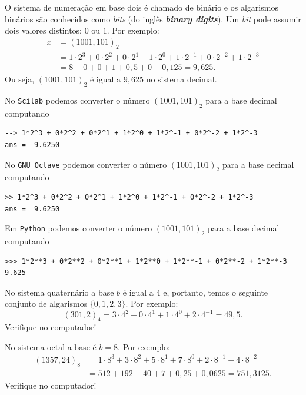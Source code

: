 \begin{ex} O sistema de numeração em base dois é chamado de binário e os algarismos binários são conhecidos como \textit{bits} (do inglês \textit{\bf{b}inary dig\bf{its}}). Um \textit{bit} pode assumir dois valores distintos: $0$ ou $1$. Por exemplo:
\begin{equation}
  \begin{split}
    x &= (1001,101)_{2} \\
    &= 1\cdot 2^3 +0\cdot 2^2 +0\cdot 2^1 +1\cdot 2^0  +1\cdot 2^{-1} +0\cdot 2^{-2} +1\cdot 2^{-3} \\
    &= 8+0+0+1+ 0,5+0+0,125 = 9,625.
  \end{split}
\end{equation}
Ou seja, $(1001,101)_{2}$ é igual a $9,625$ no sistema decimal.

\ifisscilab
No \verb+Scilab+ podemos converter o número $(1001,101)_2$ para a base decimal computando
\begin{verbatim}
--> 1*2^3 + 0*2^2 + 0*2^1 + 1*2^0 + 1*2^-1 + 0*2^-2 + 1*2^-3
ans =  9.6250
\end{verbatim}
\fi
\ifisoctave
No \verb+GNU Octave+ podemos converter o número $(1001,101)_2$ para a base decimal computando
\begin{verbatim}
>> 1*2^3 + 0*2^2 + 0*2^1 + 1*2^0 + 1*2^-1 + 0*2^-2 + 1*2^-3
ans =  9.6250
\end{verbatim}
\fi
\ifispython
Em \verb+Python+ podemos converter o número $(1001,101)_2$ para a base decimal computando
\begin{verbatim}
>>> 1*2**3 + 0*2**2 + 0*2**1 + 1*2**0 + 1*2**-1 + 0*2**-2 + 1*2**-3
9.625
\end{verbatim}
\fi
\end{ex}


\begin{ex}
No sistema quaternário a base $b$ é igual a $4$ e, portanto, temos o seguinte conjunto de algarismos $\{0, 1, 2, 3\}$. Por exemplo:
  \begin{equation}
    (301,2)_{4}=3\cdot 4^2+0\cdot 4^1+1\cdot 4^0+2\cdot 4^{-1}=49,5.
  \end{equation}
Verifique no computador!
\end{ex}

\begin{ex}
No sistema octal a base é $b=8$. Por exemplo:
\begin{equation}
  \begin{split}
    (1357,24)_{8}&= 1\cdot 8^3+3\cdot 8^2+5\cdot 8^1+7\cdot 8^{0}+2\cdot 8^{-1}+4\cdot 8^{-2}\\
    &= 512+192+40+7+0,25+0,0625=751,3125.
  \end{split}
\end{equation}
Verifique no computador!
\end{ex}

